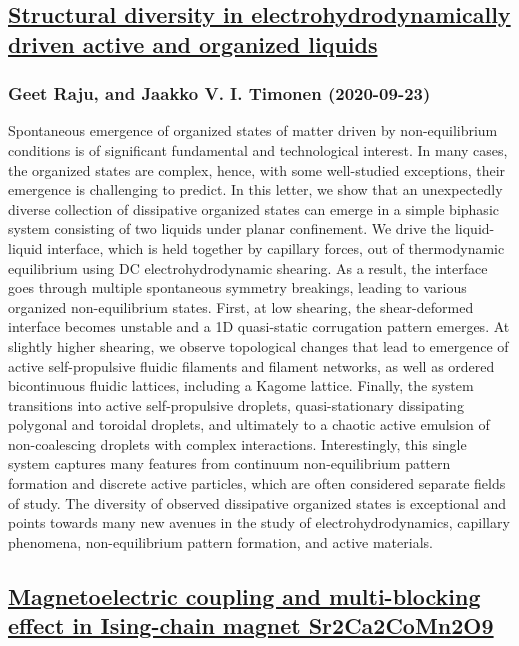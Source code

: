 \subsection*{\href{http://arxiv.org/abs/2009.10977v1}{Structural diversity in electrohydrodynamically driven active and  organized liquids}}
\subsubsection*{Geet Raju, and Jaakko V. I. Timonen (2020-09-23)}
Spontaneous emergence of organized states of matter driven by non-equilibrium
conditions is of significant fundamental and technological interest. In many
cases, the organized states are complex, hence, with some well-studied
exceptions, their emergence is challenging to predict. In this letter, we show
that an unexpectedly diverse collection of dissipative organized states can
emerge in a simple biphasic system consisting of two liquids under planar
confinement. We drive the liquid-liquid interface, which is held together by
capillary forces, out of thermodynamic equilibrium using DC electrohydrodynamic
shearing. As a result, the interface goes through multiple spontaneous symmetry
breakings, leading to various organized non-equilibrium states. First, at low
shearing, the shear-deformed interface becomes unstable and a 1D quasi-static
corrugation pattern emerges. At slightly higher shearing, we observe
topological changes that lead to emergence of active self-propulsive fluidic
filaments and filament networks, as well as ordered bicontinuous fluidic
lattices, including a Kagome lattice. Finally, the system transitions into
active self-propulsive droplets, quasi-stationary dissipating polygonal and
toroidal droplets, and ultimately to a chaotic active emulsion of
non-coalescing droplets with complex interactions. Interestingly, this single
system captures many features from continuum non-equilibrium pattern formation
and discrete active particles, which are often considered separate fields of
study. The diversity of observed dissipative organized states is exceptional
and points towards many new avenues in the study of electrohydrodynamics,
capillary phenomena, non-equilibrium pattern formation, and active materials.

\subsection*{\href{http://arxiv.org/abs/2009.10969v1}{Magnetoelectric coupling and multi-blocking effect in Ising-chain magnet  Sr2Ca2CoMn2O9}}
